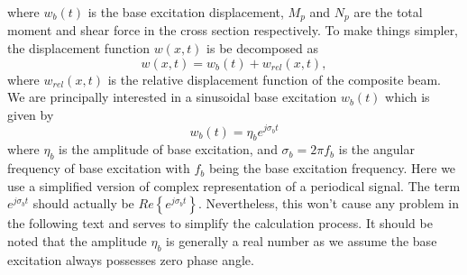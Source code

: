 \documentclass{article}
\begin{document}
where $w_b(t)$ is the base excitation displacement, $M_p$ and $N_p$ are the total moment and shear force in the cross section respectively. To make things simpler, the displacement function $w(x,t)$ is be decomposed as 
\begin{equation}
    w(x,t) = w_b(t) + w_{rel}(x,t),
\end{equation}
where $w_{rel}(x,t)$ is the relative displacement function of the composite beam. We are principally interested in a sinusoidal base excitation $w_b(t)$ which is given by
\begin{equation}
    w_b(t) = \eta_b e^{j \sigma_b t}
\end{equation}
where $\eta_b$ is the amplitude of base excitation, and $\sigma_b = 2 \pi f_b$ is the angular frequency of base excitation with $f_b$ being the base excitation frequency. Here we use a simplified version of complex representation of a periodical signal. The term $e^{j \sigma_b t}$ should actually be $Re\left\{e^{j \sigma_b t}\right\}$. Nevertheless, this won't cause any problem in the following text and serves to simplify the calculation process. It should be noted that the amplitude $\eta_b$ is generally a real number as we assume the base excitation always possesses zero phase angle. 
\end{document}
